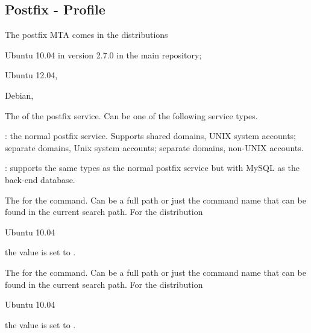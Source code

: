 \label{sec:postfix_profile}
\subsection{Postfix - Profile}

The postfix MTA comes in the distributions 
\begin{compactitem}
\item[\TheDistribution{ubuntu}] Ubuntu 10.04 in version 2.7.0 in the main repository;
\item[\TheDistribution{ubuntu}] Ubuntu 12.04,
\item[\TheDistribution{debian}] Debian,
\end{compactitem}


The  of the postfix service. Can be one of the following 
service types.
\begin{asparaitem}
\item[\qcode{postfix}:] 
the normal postfix service. Supports shared domains, UNIX system accounts;
separate domains, Unix system accounts; separate domains, non-UNIX accounts.

\item[\qcode{postfix-mysql}:] supports the same types as the normal 
postfix service but with MySQL as the back-end database.
\end{asparaitem}


The  for the  command. Can be a full path or
just the command name that can be found in the current search path.
For the distribution
\begin{inparaitem}
\item[\TheDistribution{ubuntu}] Ubuntu 10.04
\end{inparaitem}
the value is set to .


The  for the  command. Can be a full path or
just the command name that can be found in the current search path.
For the distribution
\begin{inparaitem}
\item[\TheDistribution{ubuntu}] Ubuntu 10.04
\end{inparaitem}
the value is set to .

